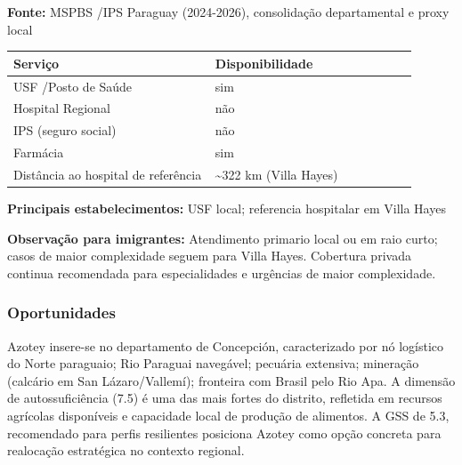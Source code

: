 \textbf{Fonte:} MSPBS /\allowbreak \allowbreak  IPS Paraguay (2024-2026), consolidação
departamental e proxy local

{\def\LTcaptype{none} %
\begin{longtable}{@{}>{\raggedright\arraybackslash}p{0.45\linewidth} >{\raggedright\arraybackslash}p{0.45\linewidth}@{}}
\toprule\noalign{}
Serviço & Disponibilidade \\
\midrule\noalign{}
\endhead
\bottomrule\noalign{}
\endlastfoot
USF /\allowbreak \allowbreak  Posto de Saúde & sim \\
Hospital Regional & não \\
IPS (seguro social) & não \\
Farmácia & sim \\
Distância ao hospital de referência & \textasciitilde322 km (Villa
Hayes) \\
\end{longtable}
}

\textbf{Principais estabelecimentos:} USF local; referencia hospitalar
em Villa Hayes

\textbf{Observação para imigrantes:} Atendimento primario local ou em
raio curto; casos de maior complexidade seguem para Villa Hayes.
Cobertura privada continua recomendada para especialidades e urgências
de maior complexidade.
\newpage

\subsubsection*{Oportunidades}\label{oport-azotey-0104}
Azotey insere-se no departamento de Concepción, caracterizado por nó logístico do Norte paraguaio; Rio Paraguai navegável; pecuária extensiva; mineração (calcário em San Lázaro/Vallemí); fronteira com Brasil pelo Rio Apa. A dimensão de autossuficiência (7.5) é uma das mais fortes do distrito, refletida em recursos agrícolas disponíveis e capacidade local de produção de alimentos. A GSS de 5.3, recomendado para perfis resilientes posiciona Azotey como opção concreta para realocação estratégica no contexto regional.

